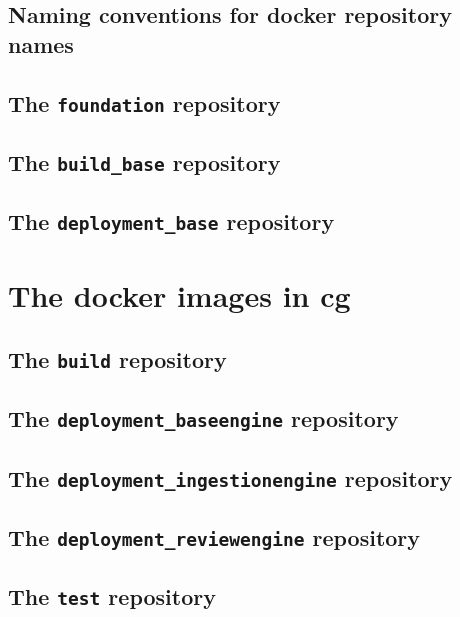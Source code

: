 		\subsection{Naming conventions for docker repository names}
		\subsection{The \texttt{foundation} repository}
		\subsection{The \texttt{build\_base} repository}
		\subsection{The \texttt{deployment\_base} repository}
	\section{The docker images in cg}
		\subsection{The \texttt{build} repository}
		\subsection{The \texttt{deployment\_baseengine} repository}
		\subsection{The \texttt{deployment\_ingestionengine} repository}
		\subsection{The \texttt{deployment\_reviewengine} repository}
		\subsection{The \texttt{test} repository}